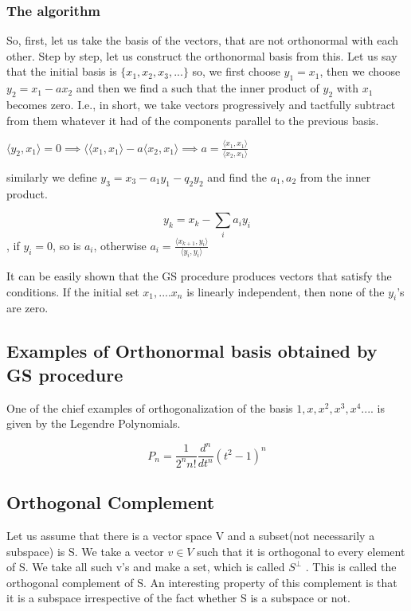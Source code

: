 \subsubsection{The algorithm}

So, first, let us take the basis of the vectors, that are not orthonormal with each other. Step by step, let us construct the orthonormal basis from this. Let us say that the initial basis is $\{x_1, x_2, x_3,...\}$ so, we first choose $y_1=x_1$, then we choose $y_2=x_1-ax_2$
and then we find a such that the inner product of $y_2$ with $x_1$ becomes zero.  I.e., in short, we take vectors progressively and tactfully subtract from them whatever it had of the components parallel to the previous basis. 

$\langle y_2, x_1 \rangle =0 \implies \langle \langle x_1, x_1 \rangle -a \langle x_2, x_1 \rangle \implies a =\frac{\langle x_1, x_1 \rangle}{\langle x_2, x_1\rangle}$

similarly we define $y_3= x_3 -a_1y_1 -q_2y_2$
and find the $a_1, a_2$ from the inner product. 

$$y_k = x_k -\sum_i a_i y_i$$, if $y_i=0$, so is $a_i$, otherwise $a_i =\frac{\langle x_{k+1}, y_i\rangle}{\langle y_i, y_i \rangle}$

It can be easily shown that the GS procedure produces vectors that satisfy the conditions. If the initial set $x_1, .... x_n$ is linearly independent, then none of the $y_i$'s are zero.


\subsection{Examples of Orthonormal basis obtained by GS procedure}

One of the chief examples of orthogonalization of the basis $1, x, x^2, x^3, x^4....$ is given by the Legendre Polynomials.

$$P_n=\frac{1}{2^n n!} \frac{d^n}{dt^n}(t^2-1)^n$$

\subsection{Orthogonal Complement}

Let us assume that there is a vector space V and a subset(not necessarily a subspace) is S. We take a vector $v \in V$ such that it is orthogonal to every element of S. We take all such v's and make a set, which is called $S^\perp$ . This is called the orthogonal complement of S. An interesting property of this complement is that it is a subspace irrespective of the fact whether S is a subspace or not. 

